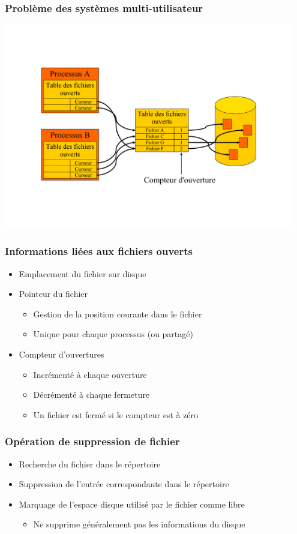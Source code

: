 \begin{frame}
\frametitle{Problème des systèmes multi-utilisateur}
\includegraphics[width=0.95\textwidth]{../illustration/table_fichiers_ouverts_multi.pdf}
\end{frame}

\begin{frame}
\frametitle{Informations liées aux fichiers ouverts}
\begin{itemize}
\item Emplacement du fichier sur disque
\item Pointeur du fichier
\begin{itemize}
\item Gestion de la position courante dans le fichier
\item Unique pour chaque processus (ou partagé)
\end{itemize}
\item Compteur d'ouvertures
\begin{itemize}
\item Incrémenté à chaque ouverture
\item Décrémenté à chaque fermeture
\item Un fichier est fermé si le compteur est à zéro
\end{itemize}
\end{itemize}
\end{frame}

\begin{frame}
\frametitle{Opération de suppression de fichier}
\begin{itemize}
\item Recherche du fichier dans le répertoire
\item Suppression de l'entrée correspondante dans le répertoire
\item Marquage de l'espace disque utilisé par le fichier comme libre
\begin{itemize}
\item Ne supprime généralement pas les informations du disque
\end{itemize}
\end{itemize}
\end{frame}

